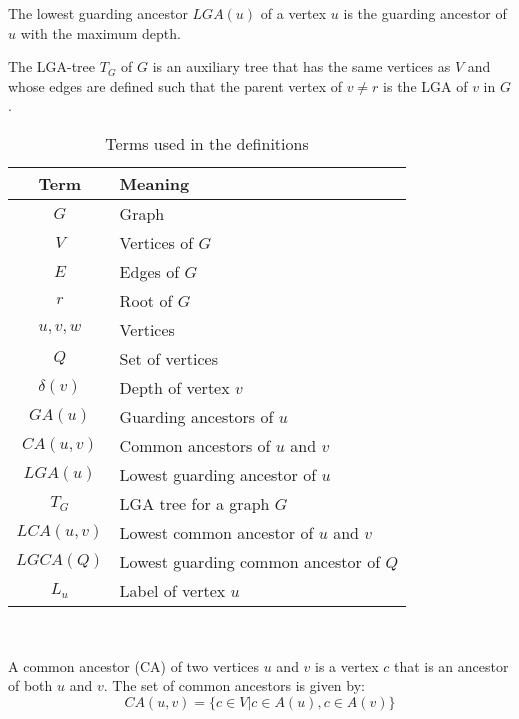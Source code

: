 \begin{definition}
	The lowest guarding ancestor $LGA(u)$ of a vertex $u$ is the guarding ancestor of $u$ with the maximum depth.
\end{definition}

\begin{definition}
	The LGA-tree $T_G$ of $G$  is an auxiliary tree that has the same vertices as $V$ and whose edges are defined such that the parent vertex of $v \neq r$ is the LGA of $v$ in $G$.
\end{definition}

\begin{table}[ht]
    \centering
	\captionsetup{justification=centering}
	\begin{tabular}{c l}
		\textbf{Term} & \textbf{Meaning} \\
		\hline 
		$G$ & Graph \\
		$V$ & Vertices of $G$\\
		$E$ & Edges of $G$\\
		$r$ & Root of $G$\\
		$u, v, w$& Vertices \\
		$Q$ & Set of vertices\\
		$\delta(v)$ & Depth of vertex $v$\\
		$GA(u)$ & Guarding ancestors of $u$\\
		$CA(u,v)$ & Common ancestors of $u$ and $v$\\
		$LGA(u)$ & Lowest guarding ancestor of $u$\\
		$T_G$ & LGA tree for a graph $G$\\
		$LCA(u,v)$ & Lowest common ancestor of $u$ and $v$\\
		$LGCA(Q)$ & Lowest guarding common ancestor of $Q$\\
		$L_u$ & Label of vertex $u$\\
	\end{tabular}\\
	\caption{Terms used in the definitions}
	\label{definitionsLegend}
\end{table}

\begin{definition} \label{def:commonAncestor}
	A common ancestor (CA) of two vertices $u$ and $v$ is a vertex $c$ that is an ancestor of both $u$ and $v$.
	The set of common ancestors is given by:
	\begin{equation*}
		\mathit{CA}(u,v) =	\{c \in V | c \in A(u) , c \in A(v)\}
	\end{equation*}
\end{definition}

